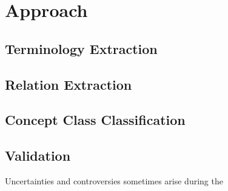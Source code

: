 \section{Approach}

\subsection{Terminology Extraction}


\subsection{Relation Extraction}


\subsection{Concept Class Classification}


\subsection{Validation}

Uncertainties and controversies sometimes arise during the 
